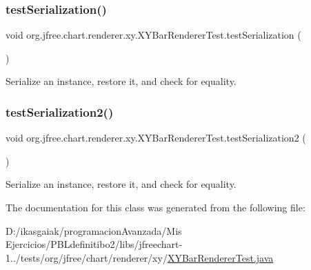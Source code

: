 \subsubsection{\texorpdfstring{test\+Serialization()}{testSerialization()}}
{\footnotesize\ttfamily void org.\+jfree.\+chart.\+renderer.\+xy.\+X\+Y\+Bar\+Renderer\+Test.\+test\+Serialization (\begin{DoxyParamCaption}{ }\end{DoxyParamCaption})}

Serialize an instance, restore it, and check for equality. \mbox{\label{classorg_1_1jfree_1_1chart_1_1renderer_1_1xy_1_1_x_y_bar_renderer_test_a18c20d0b532f14665bffaa9d9a5f7606}} 
\subsubsection{\texorpdfstring{test\+Serialization2()}{testSerialization2()}}
{\footnotesize\ttfamily void org.\+jfree.\+chart.\+renderer.\+xy.\+X\+Y\+Bar\+Renderer\+Test.\+test\+Serialization2 (\begin{DoxyParamCaption}{ }\end{DoxyParamCaption})}

Serialize an instance, restore it, and check for equality. 

The documentation for this class was generated from the following file\+:\begin{DoxyCompactItemize}
\item 
D\+:/ikasgaiak/programacion\+Avanzada/\+Mis Ejercicios/\+P\+B\+Ldefinitibo2/libs/jfreechart-\/1../tests/org/jfree/chart/renderer/xy/\mbox{\hyperlink{_x_y_bar_renderer_test_8java}{X\+Y\+Bar\+Renderer\+Test.\+java}}\end{DoxyCompactItemize}
